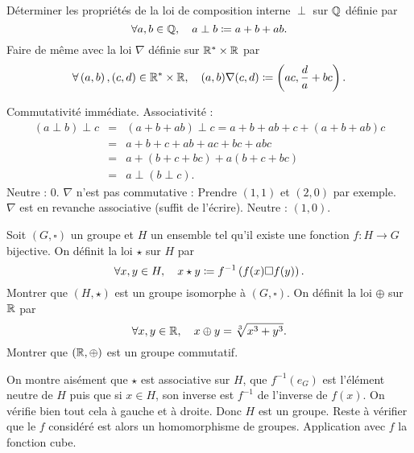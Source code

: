 \documentclass{magnolia}
\begin{document}

\begin{questions}
\question Déterminer les propriétés de la loi de composition interne $\perp$
  sur $\mathbb{Q}$ définie par
  \[\forall a,b\in\mathbb{Q} ,\quad a\perp b\coloneqq a+b+ab.\]
\question Faire de même avec la loi $\nabla$ définie sur  ${\mathbb{R}^*}\times\mathbb{R}$ par
  \[\forall \left(a,b\right),\left(c,d\right)\in{\mathbb{R}^*}\times\mathbb{R} ,\quad
    (a,b)\nabla(c,d)\coloneqq\left(ac,\frac{d}{a}+bc\right).\]
\end{questions}

\begin{sol}
\begin{questions}
\question Commutativité immédiate.
Associativité :
\begin{eqnarray*}
(a\perp b)\perp c&=&(a+b+ab)\perp c=a+b+ab+c+(a+b+ab)c\\
&=&a+b+c+ab+ac+bc+abc\\
&=&a+(b+c+bc)+a(b+c+bc)\\
&=&a\perp (b\perp c).
\end{eqnarray*}
Neutre : 0.
\question $\nabla$ n'est pas commutative : Prendre $(1,1)$ et $(2,0)$ par exemple. \\
$\nabla$ est en revanche associative (suffit de l'écrire).
Neutre : $(1,0)$.
\end{questions}
\end{sol}

\begin{questions}
\question Soit $(G,\square)$ un groupe et $H$ un ensemble tel qu'il existe une
  fonction $f:H\to G$ bijective. On définit la loi $\star$ sur $H$ par
  \[\forall x,y\in H ,\quad x\star y\coloneqq f^{-1}\left(f(x)\square f(y)\right).\]
  Montrer que $(H,\star)$ est un groupe isomorphe à $(G,\square)$. 
\question On définit la loi $\oplus$ sur $\mathbb{R}$ par
  \[\forall x,y\in\mathbb{R} ,\quad x\oplus y=\sqrt[3]{x^3+y^3}.\]
  Montrer que $(\mathbb{R},\oplus)$ est un groupe commutatif.
\end{questions}
\begin{sol}
\begin{questions}
\question On montre aisément que $\star$ est associative sur $H$, que $f^{-1}(e_G)$ est l'élément neutre de $H$ puis que si $x\in H$, son inverse est $f^{-1}$ de l'inverse de $f(x)$. On vérifie bien tout cela à gauche et à droite. Donc $H$ est un groupe. Reste à vérifier que le $f$ considéré est alors un homomorphisme de groupes.
\question Application avec $f$ la fonction cube.
\end{questions}
\end{sol}
\end{document}
